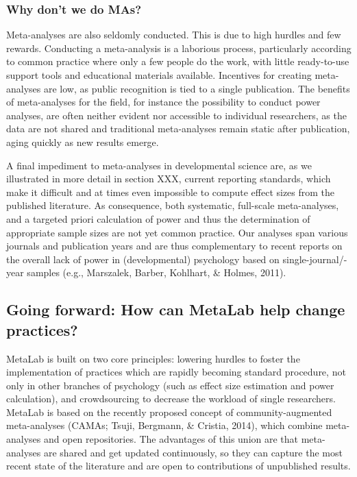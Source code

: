 \documentclass[english,floatsintext,man]{apa6}
\begin{document}
\subsubsection{Why don't we do MAs?}\label{why-dont-we-do-mas}

Meta-analyses are also seldomly conducted. This is due to high hurdles
and few rewards. Conducting a meta-analysis is a laborious process,
particularly according to common practice where only a few people do the
work, with little ready-to-use support tools and educational materials
available. Incentives for creating meta-analyses are low, as public
recognition is tied to a single publication. The benefits of
meta-analyses for the field, for instance the possibility to conduct
power analyses, are often neither evident nor accessible to individual
researchers, as the data are not shared and traditional meta-analyses
remain static after publication, aging quickly as new results emerge.

A final impediment to meta-analyses in developmental science are, as we
illustrated in more detail in section XXX, current reporting standards,
which make it difficult and at times even impossible to compute effect
sizes from the published literature. As consequence, both systematic,
full-scale meta-analyses, and a targeted priori calculation of power and
thus the determination of appropriate sample sizes are not yet common
practice. Our analyses span various journals and publication years and
are thus complementary to recent reports on the overall lack of power in
(developmental) psychology based on single-journal/-year samples (e.g.,
Marszalek, Barber, Kohlhart, \& Holmes, 2011).

\subsection{Going forward: How can MetaLab help change
practices?}\label{going-forward-how-can-metalab-help-change-practices}

MetaLab is built on two core principles: lowering hurdles to foster the
implementation of practices which are rapidly becoming standard
procedure, not only in other branches of psychology (such as effect size
estimation and power calculation), and crowdsourcing to decrease the
workload of single researchers. MetaLab is based on the recently
proposed concept of community-augmented meta-analyses (CAMAs; Tsuji,
Bergmann, \& Cristia, 2014), which combine meta-analyses and open
repositories. The advantages of this union are that meta-analyses are
shared and get updated continuously, so they can capture the most recent
state of the literature and are open to contributions of unpublished
results.
\end{document}
